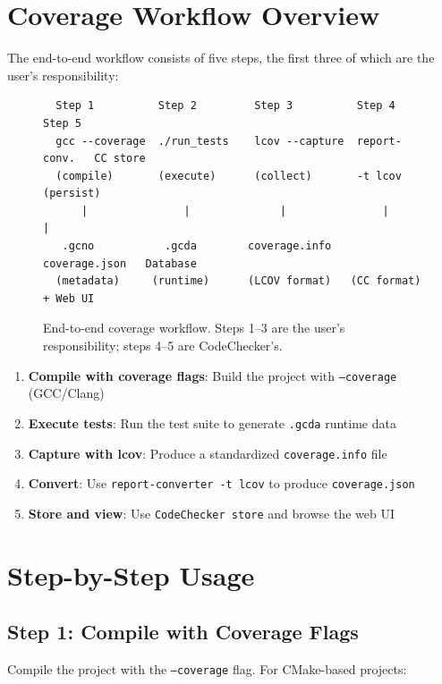 \section{Coverage Workflow Overview}

The end-to-end workflow consists of five steps, the first three of which are the user's responsibility:

\begin{figure}[H]
\centering
\begin{verbatim}
  Step 1          Step 2         Step 3          Step 4         Step 5
  gcc --coverage  ./run_tests    lcov --capture  report-conv.   CC store
  (compile)       (execute)      (collect)       -t lcov        (persist)
      |               |              |               |              |
   .gcno           .gcda        coverage.info   coverage.json   Database
  (metadata)     (runtime)      (LCOV format)   (CC format)      + Web UI
\end{verbatim}
\caption{End-to-end coverage workflow. Steps 1--3 are the user's responsibility; steps 4--5 are CodeChecker's.}
\label{fig:workflow}
\end{figure}

\begin{enumerate}
    \item \textbf{Compile with coverage flags}: Build the project with \texttt{--coverage} (GCC/Clang)
    \item \textbf{Execute tests}: Run the test suite to generate \texttt{.gcda} runtime data
    \item \textbf{Capture with lcov}: Produce a standardized \texttt{coverage.info} file
    \item \textbf{Convert}: Use \texttt{report-converter -t lcov} to produce \texttt{coverage.json}
    \item \textbf{Store and view}: Use \texttt{CodeChecker store} and browse the web UI
\end{enumerate}

\section{Step-by-Step Usage}

\subsection{Step 1: Compile with Coverage Flags}

Compile the project with the \texttt{--coverage} flag. For CMake-based projects:

